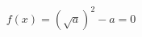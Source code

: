 \documentclass[preview]{standalone}
\begin{document}
\begin{align*}
f(x) = (\sqrt{a})^2-a  = 0
\end{align*}
\end{document}
